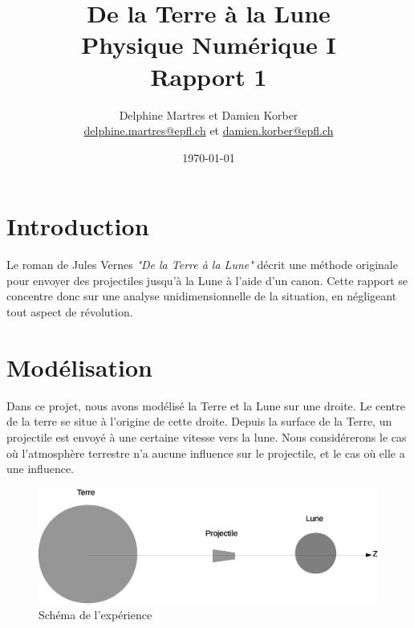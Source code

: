 \documentclass[a4paper,12pt,twoside]{article}
\newcommand{\mail}[1]{{\href{mailto:#1}{#1}}}
\begin{document}
\title{De la Terre à la Lune\\{\small Physique Numérique I}\\{\small Rapport 1}}
\date{\today}
\author{Delphine Martres et Damien Korber\\{\small \mail{delphine.martres@epfl.ch} et \mail{damien.korber@epfl.ch}}}
\maketitle
\tableofcontents %

\baselineskip=16pt
\parindent=15pt
\parskip=5pt




\section{Introduction}
Le roman de Jules Vernes \textit{"De la Terre à la Lune"} décrit une méthode originale pour envoyer des projectiles jusqu'à la Lune à l'aide d'un canon.
Cette rapport se concentre donc sur une analyse unidimensionnelle de la situation, en négligeant tout aspect de révolution.

\section{Modélisation}
Dans ce projet, nous avons modélisé la Terre et la Lune sur une droite.
Le centre de la terre se situe à l'origine de cette droite.
Depuis la surface de la Terre, un projectile est envoyé à une certaine vitesse vers la lune.
Nous considérerons le cas où l'atmosphère terrestre n'a aucune influence sur le projectile, et le cas où elle a une influence.

\begin{figure}[h]
	\centering
	\includegraphics[width=.8\linewidth]{schema/schema.eps}
	\caption{Schéma de l'expérience}
	\label{fig:schema}
\end{figure}
\end{document}
